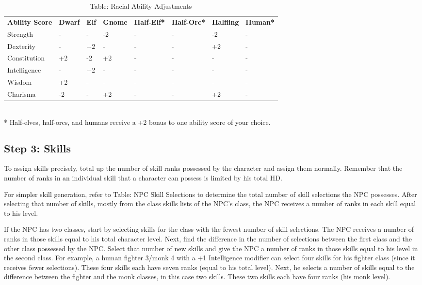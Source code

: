 \begin{table*}[]
\sffamily
\caption{Table: Racial Ability Adjustments}
\begin{tabular}{llllllll}
\textbf{Ability Score} & \textbf{Dwarf} & \textbf{Elf} & \textbf{Gnome} & \textbf{Half-Elf*} & \textbf{Half-Orc*} & \textbf{Halfling} & \textbf{Human*}\\
Strength & - & - & -2 & - & - & -2 & - \\
 Dexterity & - & +2 & - & - & - & +2 & - \\
 Constitution & +2 & -2 & +2 & - & - & - & - \\
 Intelligence & - & +2 & - & - & - & - & - \\
 Wisdom & +2 & - & - & - & - & - & - \\
 Charisma & -2 & - & +2 & - & - & +2 & -\\
\end{tabular}\\
* Half-elves, half-orcs, and humans receive a +2 bonus to one ability score of your choice.\\
\end{table*}

\subsection{Step 3: Skills}

				
To assign skills precisely, total up the number of skill ranks possessed by the character and assign them normally. Remember that the number of ranks in an individual skill that a character can possess is limited by his total HD.
				
For simpler skill generation, refer to Table: NPC Skill Selections to determine the total number of skill selections the NPC possesses. After selecting that number of skills, mostly from the class skills lists of the NPC's class, the NPC receives a number of ranks in each skill equal to his level. 
				
If the NPC has two classes, start by selecting skills for the class with the fewest number of skill selections. The NPC receives a number of ranks in those skills equal to his total character level. Next, find the difference in the number of selections between the first class and the other class possessed by the NPC. Select that number of new skills and give the NPC a number of ranks in those skills equal to his level in the second class. For example, a human fighter 3/monk 4 with a +1 Intelligence modifier can select four skills for his fighter class (since it receives fewer selections). These four skills each have seven ranks (equal to his total level). Next, he selects a number of skills equal to the difference between the fighter and the monk classes, in this case two skills. These two skills each have four ranks (his monk level).
				
